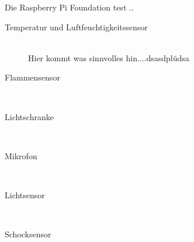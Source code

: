 
Die Raspberry Pi Foundation \cite{GPIOMode77:online} test ..

\begin{description}
\item[Temperatur und Luftfeuchtigkeitssensor] \hfill \\
	Hier kommt was sinnvolles hin....dsasdplüdsa
\item[Flammensensor]\hfill \\
\item[Lichtschranke]\hfill \\
\item[Mikrofon]\hfill \\
\item[Lichtsensor]\hfill \\
\item[Schocksensor]\hfill \\
\end{description}